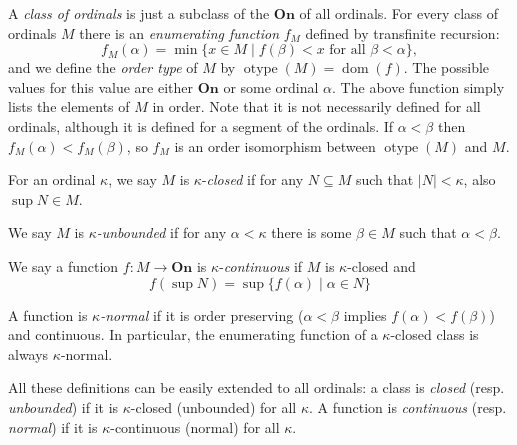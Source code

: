 \documentclass[12pt]{article}
\def\dom{\operatorname{dom}}
\begin{document}

A \emph{class of ordinals} is just a subclass of the  $\mathbf{On}$ of all ordinals. For every class of ordinals $M$ there is an \emph{enumerating function} $f_M$ defined by transfinite recursion:
$$f_M(\alpha)=\min\{x\in M\mid f(\beta)<x\text{ for all }\beta<\alpha\},$$
and we define the \emph{order type} of $M$ by $\operatorname{otype}(M)=\dom(f)$.  The possible values for this value are either $\mathbf{On}$ or some ordinal $\alpha$. The above function simply lists the elements of $M$ in order. Note that it is not necessarily defined for all ordinals, although it is defined for a segment of the ordinals. If $\alpha<\beta$ then $f_M(\alpha)<f_M(\beta)$, so $f_M$ is an order isomorphism between $\operatorname{otype}(M)$ and $M$.

For an ordinal $\kappa$, we say $M$ is $\kappa$-\emph{closed} if for any $N\subseteq M$ such that $|N|<\kappa$, also $\sup N\in M$.

We say $M$ is \emph{$\kappa$-unbounded} if for any $\alpha<\kappa$ there is some $\beta\in M$ such that $\alpha<\beta$.

We say a function $f\colon M\rightarrow\mathbf{On}$ is $\kappa$-\emph{continuous} if $M$ is $\kappa$-closed and
$$f(\sup N)=\sup \{f(\alpha)\mid \alpha\in N\}$$

A function is \emph{$\kappa$-normal} if it is order preserving ($\alpha<\beta$ implies $f(\alpha)<f(\beta)$) and continuous. In particular, the enumerating function of a $\kappa$-closed class is always $\kappa$-normal.

All these definitions can be easily extended to all ordinals: a class is \emph{closed} (resp. \emph{unbounded}) if it is $\kappa$-closed (unbounded) for all $\kappa$. A function is \emph{continuous} (resp. \emph{normal}) if it is $\kappa$-continuous (normal) for all $\kappa$.
\end{document}
